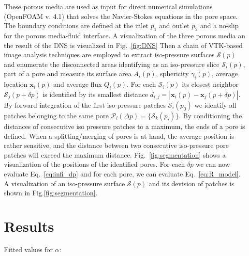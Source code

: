 \documentclass[draft]{agujournal2019}
\begin{document}
These porous media are used as input for direct numerical simulations (OpenFOAM v. 4.1)   that solves the Navier-Stokes equations in the pore space. The boundary conditions are defined at the inlet $p_1$ and outlet $p_2$ and a no-slip for the porous media-fluid interface. A visualization of the three porous media an the result of the DNS is visualized in Fig.~\ref{fig:DNS}
Then a chain of VTK-based image analysis techniques  are employed to extract iso-pressure surfaces $\mathcal{S}(p)$ and enumerate the disconnected areas identifying as an iso-pressure slice $\mathcal{S}_i(p)$, part of a pore and measure its surface area $A_i(p)$, sphericity $\gamma_i(p)$, average location $\mathbf{x}_i(p)$ and average flux $Q_i(p)$. For each $\mathcal{S}_i(p)$ its closest neighbor $\mathcal{S}_j(p+\delta p)$ is identified by its smallest distance $d_{i,j}= \left|  \mathbf{x}_i(p)-\mathbf{x}_j(p+\delta p)\right|$. By forward integration of the first iso-pressure patches $\mathcal{S}_i(p_0)$ we identify all patches belonging to the same pore $\mathcal{P}_l(\Delta p) = \{\mathcal{S}_k(p_i)\}$. By conditioning the distances of consecutive iso pressure patches to a maximum, the ends of a pore is defined. When a splitting/merging of pores is at hand, the average position is rather sensitive, and the distance between two consecutive iso-pressure pore patches will exceed the maximum distance. Fig.~\ref{fig:segmentation} shows a visualization of the positions of the identified pores. For each $\delta p$ we can now evaluate Eq.~\ref{eq:infi_dp} and for each pore, we can evaluate Eq.~\ref{eq:R_model}. A visualization of an iso-pressure surface $\mathcal{S}(p)$ and its devision of patches is shown in Fig.\ref{fig:segmentation}. 



\section{Results} 
Fitted values for $\alpha $:
\end{document}
